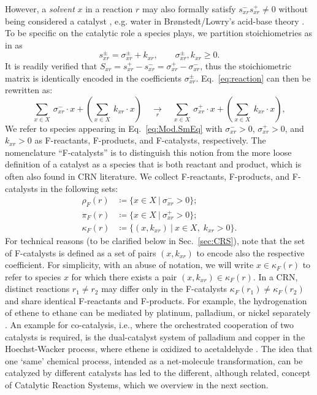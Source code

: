 \documentclass[pdflatex]{sn-jnl}
\theoremstyle{thmstyleone}%
\theoremstyle{examplesty}%
\theoremstyle{thmstylethree}%
\newcommand{\SM}{S}
\newcommand{\cat}{\kappa_F}
\newcommand{\feducts}{\rho_F}
\newcommand{\fproducts}{\pi_F}
\begin{document}
However, a \emph{solvent} $x$ in a reaction $r$ may also formally satisfy
$s^-_{xr}s^+_{xr}\neq 0$ without being considered a catalyst
\cite{marx_nature_1999}, e.g. water in Br{\o}nstedt/Lowry's acid-base
theory \cite{eigen_proton_1964}. To be specific on the catalytic role a
species plays, we partition stoichiometries as in
\cite{golnik_bridging_2026} as
\begin{equation}
  s^{\pm}_{xr}=\sigma^{\pm}_{xr} + k_{xr},\qquad \sigma^{\pm}_{xr}, k_{xr}\ge0.
\end{equation}
It is readily verified that
$\SM_{xr} = s^+_{xr}-s^-_{xr} = \sigma^+_{xr} - \sigma^-_{xr}$, thus the
stoichiometric matrix is identically encoded in the coefficients
$\sigma^{\pm}_{xr}$.  Eq.~\ref{eq:reaction} can then be rewritten as:
\begin{equation}\label{eq:Mod.SmEq}
  \sum_{x\in X}\ \sigma^-_{xr} \cdot x + \left(\sum_{x\in X}\ k_{xr}
    \cdot x\right) \quad
  \underset{r}{\longrightarrow} \quad
  \sum_{x\in X} \ \sigma^+_{xr} \cdot x +
  \left(\sum_{x\in X}\ k_{xr} \cdot x\right),
\end{equation}
We refer to species appearing in Eq.~\ref{eq:Mod.SmEq} with
$\sigma^{-}_{xr}>0$, $\sigma^{+}_{xr}>0$, and $k_{xr}>0$ as F-reactants,
F-products, and F-catalysts, respectively. The nomenclature ``F-catalysts''
is to distinguish this notion from the more loose definition of a catalyst
as a species that is both reactant and product, which is often also found
in CRN literature. We collect F-reactants, F-products, and F-catalysts in
the following sets:
\begin{equation}\label{eq:setsdef}
  \begin{split}
    \feducts(r) & \coloneqq \{x\in X \ | \ \sigma^-_{xr} > 0\}; \\
    \fproducts(r) & \coloneqq \{x\in X \ | \ \sigma^+_{xr} > 0\}; \\
    \cat(r)&\coloneqq \{(x, k_{xr})\ | \ x\in X,\; k_{xr}>0\}.
  \end{split}
\end{equation} 
For technical reasons (to be clarified below in Sec.~\ref{sec:CRS}), note
that the set of F-catalysts is defined as a set of pairs $(x,k_{xr})$ to
encode also the respective coefficient. For simplicity, with an abuse of
notation, we will write $x\in \cat(r)$ to refer to species $x$ for which
there exists a pair $(x,k_{xr})\in \cat(r)$. In a CRN, distinct reactions
$r_1\neq r_2$ may differ only in the F-catalysts
$\cat(r_1)\neq \cat(r_2)$ and share identical F-reactants and
F-products. For example, the hydrogenation of ethene to ethane can be
mediated by platinum, palladium, or nickel separately
\cite{crampton_ethylene_2016}. An example for co-catalysis, i.e., where the
orchestrated cooperation of two catalysts is required, is the dual-catalyst
system of palladium and copper in the Hoechst-Wacker process, where ethene
is oxidized to acetaldehyde \cite{jira_acetaldehyde_2009}. The idea that
one `same' chemical process, intended as a net-molecule transformation, can
be catalyzed by different catalysts has led to the different, although
related, concept of Catalytic Reaction Systems, which we overview in the
next section.
\end{document}
